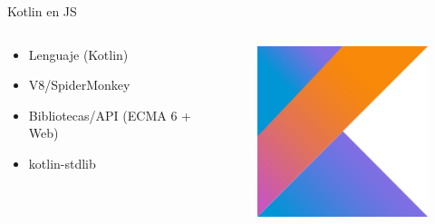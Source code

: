 \documentclass[aspectratio=169]{beamer}
\begin{document}
\begin{frame}[fragile]{Kotlin en JS}

    \begin{columns}
        \begin{column}{0.5\textwidth}
            \begin{itemize}
                \item Lenguaje (Kotlin)
                \item V8/SpiderMonkey
                \item Bibliotecas/API (ECMA 6 + Web)
                \item kotlin-stdlib
            \end{itemize}
        \end{column}
        \begin{column}{0.5\textwidth}  %
            \begin{figure}
                \centering
                \includegraphics[width=0.4\linewidth]{Images/kotlin}
            \end{figure}
        \end{column}
    \end{columns}
\end{frame}
\end{document}
